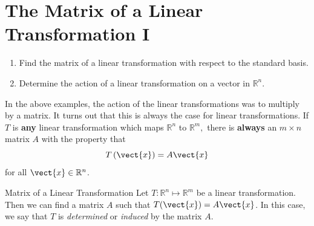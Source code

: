 \section{The Matrix of a Linear Transformation I}

\begin{outcome}
\begin{enumerate}
\item[A.] Find the matrix of a linear transformation with respect to the standard basis.

\item[B.] Determine the action of a linear transformation on a vector in $\mathbb{R}^n$.   
\end{enumerate}
\end{outcome}

In the above examples, the action of the linear transformations was to multiply by a matrix. 
It turns out that this is always the case for linear transformations.
If $T$ is \textbf{any} linear transformation which maps $\mathbb{R}^{n}$ to 
$\mathbb{R}^{m},$ there is \textbf{always} an $m\times n$ matrix $A$ with the
property that
\begin{equation}
T\left(\vect{x}\right) = A\vect{x} \label{matrixoftransf}
\end{equation}
for all $\vect{x} \in \mathbb{R}^{n}$.

\begin{theorem}{Matrix of a Linear Transformation}\label{thm:matrixlintransf}
Let $T:\mathbb{R}^{n}\mapsto \mathbb{R}^{m}$ be a linear transformation. Then we can find a matrix $A$ such that $T(\vect{x}) = A\vect{x}$. 
 In this case, we say that $T$ is {\em determined\em} or {\em induced\em}
by the matrix $A$.
\end{theorem}

